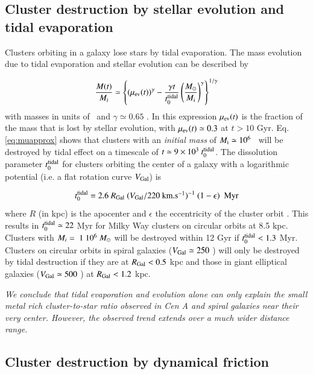 \documentclass{aa}
\begin{document}
\subsection{Cluster destruction by stellar evolution and tidal evaporation} \label{sec:stripping}

Clusters orbiting in a galaxy lose stars by tidal evaporation. The mass evolution due to tidal evaporation 
and stellar evolution can be described by 

\begin{equation}
\frac{M(t)}{M_i}\simeq 
\left\{(\mu_{\rm ev}(t))^{\gamma}-
\frac{\gamma t}{t_0^{\rm tidal}}\left(\frac{\mbox{$M_{\odot}$}}{\mbox{$M_{\rm i}$}}\right)^{\gamma}
\right\}^{1/\gamma}
\label{eq:muapprox}
\end{equation}
%
with masses in units of \Msun\ and  $\gamma \simeq 0.65$ \citep{baumgardt03,lamers05,lamers10}.
In this expression $\mu_{\rm ev}(t)$ is the fraction of the mass that is lost by stellar evolution, with
$\mu_{\rm ev}(t) \simeq 0.3$ at $t> 10$ Gyr. Eq. \ref{eq:muapprox} shows that clusters with an {\it initial mass} of $\mbox{$M_{\rm i}$}\simeq 10^{6}$ \Msun\
will be destroyed by tidal effect on a timescale of $t \simeq 9 \times 10^3~t_0^{\rm tidal}$.
The dissolution parameter $t_0^{\rm tidal}$ for clusters orbiting the center of a galaxy with a logarithmic
potential (i.e. a flat rotation curve $V_{\rm Gal}$) is

\begin{equation}
t_0^{\rm tidal} = 2.6~  R_{\rm Gal}~ (V_{\rm Gal}/220~\mbox{km.s$^{-1}$})^{-1} ~ ( 1-\epsilon)~~ {\rm Myr}
\label{eq:tzero}
\end{equation}
% 
where $R$ (in kpc) is the apocenter and $\epsilon$ the eccentricity of the cluster orbit
\citep{baumgardt03}. This results in $t_0^{\rm tidal} \simeq 22$ Myr for Milky Way clusters on circular orbits at 8.5 kpc. Clusters with $M_i = ~1~10^6~\mbox{$M_{\odot}$}$ will be destroyed within 12 Gyr if $t_0^{\rm tidal} < 1.3$ Myr.  Clusters on circular orbits in spiral galaxies ($V_{\rm Gal}\simeq 250$ \kms ) will only be destroyed by tidal destruction if they are at $R_{\rm Gal} < 0.5$ kpc and those in giant elliptical galaxies ($V_{\rm Gal} \simeq 500$ \kms) at $R_{\rm Gal} < 1.2$ kpc. 

{\it We conclude that 
tidal evaporation and evolution alone can only explain the small metal rich cluster-to-star ratio 
observed in Cen A and spiral galaxies near their very center. However, the observed trend extends 
over a much wider distance range.}    


\subsection{Cluster destruction by dynamical friction} \label{sec:dynfric}
\end{document}
